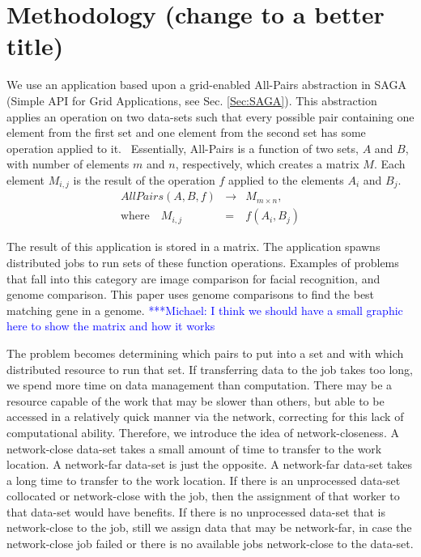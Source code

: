 \documentclass{rspublic}
\newcommand{\micnote}[1]{ {\textcolor{blue} { ***Michael: #1 }}}
\begin{document}
\section {Methodology (change to a better title)} We use an application
based upon a grid-enabled All-Pairs abstraction in SAGA (Simple API for
Grid Applications, see Sec. \ref{Sec:SAGA}). This abstraction applies an
operation on two data-sets such that every possible pair containing one
element from the first set and one element from the second set has some
operation applied to it.~\citep{Interop, AllPairs} Essentially,
All-Pairs is a function of two sets, $A$ and $B$, with number of
elements $m$ and $n$, respectively, which creates a matrix $M$. Each
element $M_{i,j}$ is the result of the operation $f$ applied to the
elements $A_i$ and $B_j$.
\begin{eqnarray}
 AllPairs(A, B, f) & \rightarrow & M_{m \times n}, \\
\mbox{where} \quad M_{i,j} & = & f(A_{i},B_{j})
 \end{eqnarray}
 
The result of this application is stored in a matrix. The application
spawns distributed jobs to run sets of these function operations.
Examples of problems that fall into this category are image comparison
for facial recognition, and genome comparison. This paper uses genome
comparisons to find the best matching gene in a genome. \micnote{I think
we should have a small graphic here to show the matrix and how it works} 

The problem becomes determining which pairs to put into a set and with
which distributed resource to run that set. If transferring data to the
job takes too long, we spend more time on data management than
computation.  There may be a resource capable of the work that may be
slower than others, but able to be accessed in a relatively quick manner
via the network, correcting for this lack of computational ability.
Therefore, we introduce the idea of network-closeness. A network-close
data-set takes a small amount of time to transfer to the work location.
A network-far data-set is just the opposite. A network-far data-set
takes a long time to transfer to the work location. If there is an
unprocessed data-set collocated or network-close with the job, then the
assignment of that worker to that data-set would have benefits. If there
is no unprocessed data-set that is network-close to the job, still we
assign data that may be network-far, in case the network-close job
failed or there is no available jobs network-close to the data-set.
\end{document}
